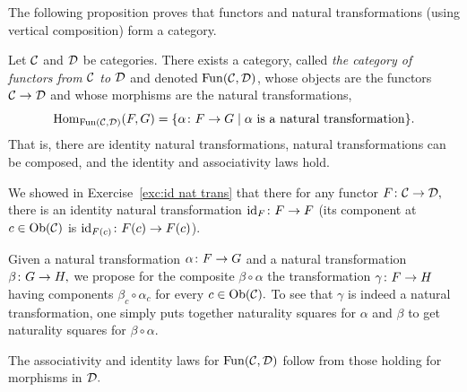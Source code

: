 \documentclass[../main/CT4S-EN-RU]{subfiles}
\begin{document}
\begin{blockRUS}
\end{blockRUS}


\subsubsection{}

\begin{blockENG}
The following proposition proves that functors and natural transformations (using vertical composition) form a category.
\end{blockENG}

\begin{blockRUS}
\end{blockRUS}

\begin{propositionENG}\label{prop:Fun(C,D)}
Let $\mathcal{C}$ and $\mathcal{D}$ be categories. There exists a category, called {\em the category of functors from $\mathcal{C}$ to $\mathcal{D}$} and denoted $\operatorname{Fun}(\mathcal{C},\mathcal{D})$, whose objects are the functors $\mathcal{C}\rightarrow\mathcal{D}$ and whose morphisms are the natural transformations,
$$\operatorname{Hom}_{\operatorname{Fun}(\mathcal{C},\mathcal{D})}(F,G)=\{\alpha\colon F\rightarrow G{\;|\;}\alpha\textnormal{ is a natural transformation}\}.$$That is, there are identity natural transformations, natural transformations can be composed, and the identity and associativity laws hold.
\end{propositionENG}

\begin{propositionRUS}\label{prop:Fun(C,D)}
\end{propositionRUS}

\begin{proofENG}
We showed in Exercise~\ref{exc:id nat trans} that there for any functor $F\colon\mathcal{C}\rightarrow\mathcal{D},$ there is an identity natural transformation $\operatorname{id}_F\colon F\rightarrow F$ (its component at $c\in\operatorname{Ob}(\mathcal{C})$ is $\operatorname{id}_{F(c)}\colon F(c)\rightarrow F(c)$). 

Given a natural transformation $\alpha\colon F\rightarrow G$ and a natural transformation $\beta\colon G\rightarrow H,$ we propose for the composite $\beta\circ\alpha$ the transformation $\gamma\colon F\rightarrow H$ having components $\beta_c\circ\alpha_c$ for every $c\in\operatorname{Ob}(\mathcal{C}).$ To see that $\gamma$ is indeed a natural transformation, one simply puts together naturality squares for $\alpha$ and $\beta$ to get naturality squares for $\beta\circ\alpha.$ 

The associativity and identity laws for $\operatorname{Fun}(\mathcal{C},\mathcal{D})$ follow from those holding for morphisms in $\mathcal{D}.$
\end{proofENG}
\end{document}
